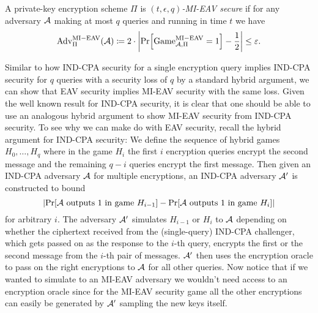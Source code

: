 \begin{definition}
	A private-key encryption scheme $\Pi$ is \emph{$(t, \epsilon, q)$-MI-EAV secure} if for any adversary $\mathcal{A}$ making at most $q$ queries and running in time $t$ we have
	\begin{align*}
		\mathrm{Adv}_{\Pi}^{\mathrm{MI-EAV}}(\adv) \coloneqq 2 \cdot \abs*{\pr{\mathrm{Game}_{\adv, \Pi}^{\mathrm{MI-EAV}} = 1} - \frac{1}{2}} \le \epsilon.
	\end{align*}
\end{definition}

Similar to how IND-CPA security for a single encryption query implies IND-CPA security for $q$ queries with a security loss of $q$ by a standard hybrid argument, we can show that EAV security implies MI-EAV security with the same loss. Given the well known result for IND-CPA security, it is clear that one should be able to use an analogous hybrid argument to show MI-EAV security from IND-CPA security. To see why we can make do with EAV security, recall the hybrid argument for IND-CPA security: We define the sequence of hybrid games $H_0, \ldots, H_q$ where in the game $H_i$ the first $i$ encryption queries encrypt the second message and the remaining $q - i$ queries encrypt the first message. Then given an IND-CPA adversary $\mathcal{A}$ for multiple encryptions, an IND-CPA adversary $\mathcal{A}'$ is constructed to bound
\[
	\abs*{\pr{\adv \text{ outputs } 1 \text{ in game } H_{i - 1}} - \pr{\adv \text{ outputs } 1 \text{ in game } H_{i}}}
\]
for arbitrary $i$.
The adversary $\mathcal{A}'$ simulates $H_{i - 1}$ or $H_{i}$ to $\mathcal{A}$ depending on whether the ciphertext received from the (single-query) IND-CPA challenger, which gets passed on as the response to the $i$-th query, encrypts the first or the second message from the $i$-th pair of messages. $\mathcal{A}'$ then uses the encryption oracle to pass on the right encryptions to $\mathcal{A}$ for all other queries. Now notice that if we wanted to simulate to an MI-EAV adversary we wouldn't need access to an encryption oracle since for the MI-EAV security game all the other encryptions can easily be generated by $\mathcal{A}'$ sampling the new keys itself.

